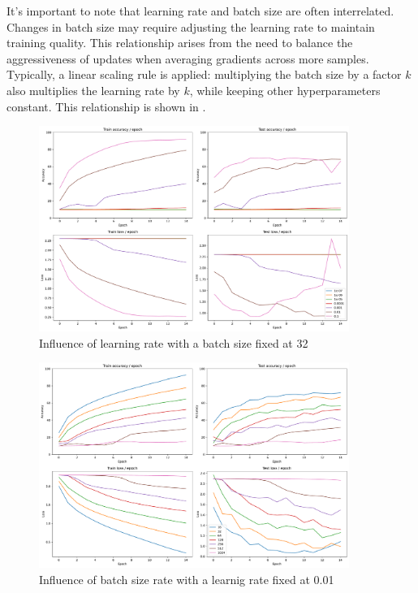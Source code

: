 It's important to note that learning rate and batch size are often interrelated. Changes in batch size may require adjusting the learning rate to maintain training quality. This relationship arises from the need to balance the aggressiveness of updates when averaging gradients across more samples. Typically, a linear scaling rule is applied: multiplying the batch size by a factor $k$ also multiplies the learning rate by $k$, while keeping other hyperparameters constant. This relationship is shown in .

\begin{figure}[H]
    \centering
    \includegraphics*[width=0.9\textwidth]{figs/CNN/learning_rate_influence.pdf}
    \caption{Influence of learning rate with a batch size fixed at 32}
    \label{fig:learning_rate_influence}
\end{figure}

\begin{figure}[H]
    \centering
    \includegraphics*[width=0.9\textwidth]{figs/CNN/batch_size_influence.pdf}
    \caption{Influence of batch size rate with a learnig rate fixed at 0.01}
    \label{fig:batch_size_influence}
\end{figure}

